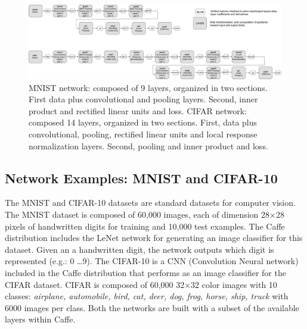 %

\begin{figure}[]
\centering
\includegraphics[width=\linewidth]{figures/mnist-cifar.pdf}
\caption{MNIST network: composed of 9 layers, organized in two sections. First data plus convolutional and pooling layers. Second, inner product and rectified linear units and loss. CIFAR network: composed 14 layers, organized in two sections. First, data plus convolutional, pooling, rectified linear units and local response normalization layers. Second, pooling and inner product and loss.}
\label{fig-mnist-cifar}
\end{figure}

\subsection{Network Examples: MNIST and CIFAR-10}
The MNIST \cite{Deng2012, MNIST} and CIFAR-10 \cite{CIFAR10} datasets are standard datasets for 
computer vision. The MNIST dataset is composed of 60,000 images, each of dimension 28$\times$28 pixels 
of handwritten digits for training and 10,000 test examples. 
The Caffe distribution includes the LeNet \cite{LeNet} network for generating an image 
classifier for this dataset. Given an a handwritten digit, 
the network outputs which digit is represented (e.g.: 0 \dots 9). 
The CIFAR-10 is a CNN (Convolution Neural network) \cite{CNN} included in the Caffe distribution
that performs as an image classifier for the CIFAR dataset. CIFAR is 
composed of 60,000 32$\times$32 color images with 10 classes: 
\emph{airplane, automobile, bird, cat, deer, dog, frog, horse, ship, 
truck} with 6000 images per class. Both the networks are built with  
a subset of the available layers within Caffe. 


